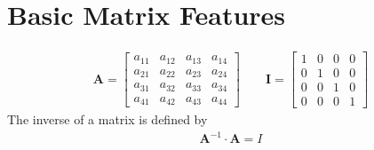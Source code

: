 \documentclass[letterpaper,10pt,english]{sphinxmanual}
\begin{document}
\section{Basic Matrix Features}
\label{\detokenize{chapter1:basic-matrix-features}}
\begin{equation*}
\begin{split}
\mathbf{A} =
      \begin{bmatrix} a_{11} & a_{12} & a_{13} & a_{14} \\
                                 a_{21} & a_{22} & a_{23} & a_{24} \\
                                   a_{31} & a_{32} & a_{33} & a_{34} \\
                                  a_{41} & a_{42} & a_{43} & a_{44}
             \end{bmatrix}\qquad
\mathbf{I} =
      \begin{bmatrix} 1 & 0 & 0 & 0 \\
                                 0 & 1 & 0 & 0 \\
                                 0 & 0 & 1 & 0 \\
                                 0 & 0 & 0 & 1
             \end{bmatrix}
\end{split}
\end{equation*}
The inverse of a matrix is defined by
\begin{equation*}
\begin{split}
\mathbf{A}^{-1} \cdot \mathbf{A} = I
\end{split}
\end{equation*}
\end{document}
